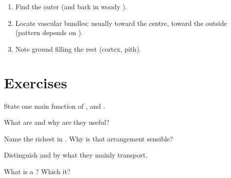 \begin{method}\label{met:g7:plant-structure:stem}
\begin{enumerate}
  \item Find the outer  (and bark in woody ).
  \item Locate vascular bundles:  usually toward the centre, 
        toward the outside (pattern depends on ).
  \item Note ground  filling the rest (cortex, pith).
\end{enumerate}
\end{method}

\section{Exercises}

\begin{exercise}[$\star$]\label{exo:g7:plant-structure:1}
State one main function of ,  and .
\end{exercise}

\begin{exercise}[$\star$]\label{exo:g7:plant-structure:2}
What are  and why are they useful?
\end{exercise}

\begin{exercise}[$\star$]\label{exo:g7:plant-structure:3}
Name the   richest in . Why is that arrangement
sensible?
\end{exercise}

\begin{exercise}[$\star$]\label{exo:g7:plant-structure:4}
Distinguish  and  by what they mainly transport.
\end{exercise}

\begin{exercise}[$\star$]\label{exo:g7:plant-structure:5}
What is a ? Which   it?
\end{exercise}

